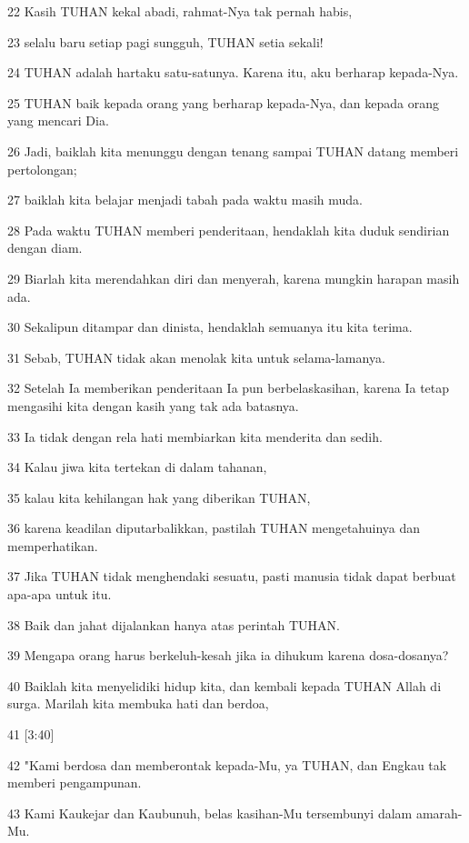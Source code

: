 \par 22 Kasih TUHAN kekal abadi, rahmat-Nya tak pernah habis,
\par 23 selalu baru setiap pagi sungguh, TUHAN setia sekali!
\par 24 TUHAN adalah hartaku satu-satunya. Karena itu, aku berharap kepada-Nya.
\par 25 TUHAN baik kepada orang yang berharap kepada-Nya, dan kepada orang yang mencari Dia.
\par 26 Jadi, baiklah kita menunggu dengan tenang sampai TUHAN datang memberi pertolongan;
\par 27 baiklah kita belajar menjadi tabah pada waktu masih muda.
\par 28 Pada waktu TUHAN memberi penderitaan, hendaklah kita duduk sendirian dengan diam.
\par 29 Biarlah kita merendahkan diri dan menyerah, karena mungkin harapan masih ada.
\par 30 Sekalipun ditampar dan dinista, hendaklah semuanya itu kita terima.
\par 31 Sebab, TUHAN tidak akan menolak kita untuk selama-lamanya.
\par 32 Setelah Ia memberikan penderitaan Ia pun berbelaskasihan, karena Ia tetap mengasihi kita dengan kasih yang tak ada batasnya.
\par 33 Ia tidak dengan rela hati membiarkan kita menderita dan sedih.
\par 34 Kalau jiwa kita tertekan di dalam tahanan,
\par 35 kalau kita kehilangan hak yang diberikan TUHAN,
\par 36 karena keadilan diputarbalikkan, pastilah TUHAN mengetahuinya dan memperhatikan.
\par 37 Jika TUHAN tidak menghendaki sesuatu, pasti manusia tidak dapat berbuat apa-apa untuk itu.
\par 38 Baik dan jahat dijalankan hanya atas perintah TUHAN.
\par 39 Mengapa orang harus berkeluh-kesah jika ia dihukum karena dosa-dosanya?
\par 40 Baiklah kita menyelidiki hidup kita, dan kembali kepada TUHAN Allah di surga. Marilah kita membuka hati dan berdoa,
\par 41 [3:40]
\par 42 "Kami berdosa dan memberontak kepada-Mu, ya TUHAN, dan Engkau tak memberi pengampunan.
\par 43 Kami Kaukejar dan Kaubunuh, belas kasihan-Mu tersembunyi dalam amarah-Mu.

